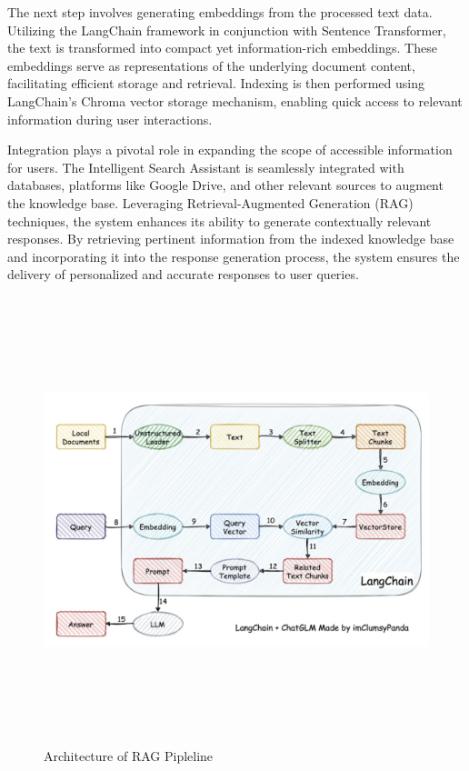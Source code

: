 \documentclass[12pt,a4paper,oneside]{report}
\begin{document}
The next step involves generating embeddings from the processed text data. Utilizing the LangChain framework in conjunction with Sentence Transformer, the text is transformed into compact yet information-rich embeddings. These embeddings serve as representations of the underlying document content, facilitating efficient storage and retrieval. Indexing is then performed using LangChain's Chroma vector storage mechanism, enabling quick access to relevant information during user interactions.

Integration plays a pivotal role in expanding the scope of accessible information for users. The Intelligent Search Assistant is seamlessly integrated with databases, platforms like Google Drive, and other relevant sources to augment the knowledge base. Leveraging Retrieval-Augmented Generation (RAG) techniques, the system enhances its ability to generate contextually relevant responses. By retrieving pertinent information from the indexed knowledge base and incorporating it into the response generation process, the system ensures the delivery of personalized and accurate responses to user queries.

\begin{figure}[ht]
    \centering
    \includegraphics[width=145mm , height = 130mm]{images/major.jpeg}
    \caption{Architecture of RAG Pipleline}
    \label{fig:figure2_2}
\end{figure}
\end{document}
